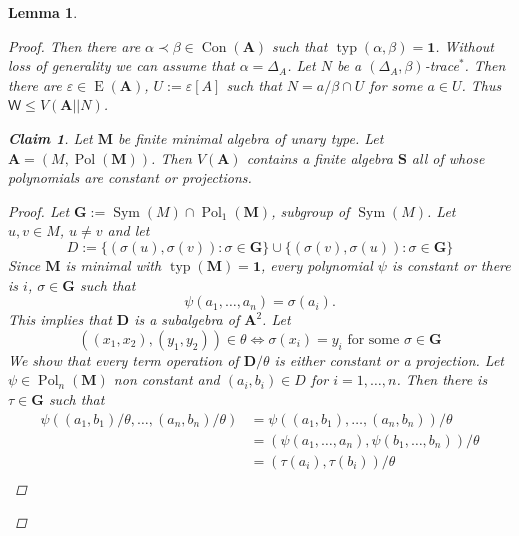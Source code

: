 \documentclass{amsart}
\theoremstyle{plain}
\newtheorem{lemma}[theorem]{Lemma}
\newtheorem{claim}{Claim}
\theoremstyle{definition}
\theoremstyle{remark}
\def\epsilon{\varepsilon}
\DeclareMathOperator{\Con}{Con}
\DeclareMathOperator{\Pol}{Pol}
\DeclareMathOperator{\typ}{typ}
\DeclareMathOperator{\Sym}{Sym}
\DeclareMathOperator{\Id}{E}
\begin{document}
\begin{lemma}
\begin{proof}
        Then there are $\alpha \prec \beta \in \Con(\mathbf{A})$ such that $\typ(\alpha, \beta) =\mathbf{1}$. 
        Without loss of generality we can assume that $\alpha = \Delta_A$. 
        Let $N$ be a $(\Delta_A, \beta)$-trace$^{*}$.
        Then there are $\epsilon \in \Id(\mathbf{A})$, $U:=\epsilon[A]$ such that $N = a /\beta \cap U$ for some $a \in U$. 
        Thus $\mathsf{W} \le V(\mathbf{A}||N)$. 
        \begin{claim}
            Let $\mathbf{M}$ be finite minimal algebra of unary type. 
            Let $\mathbf{A}=(M, \Pol(\mathbf{M}))$.
            Then $V(\mathbf{A})$ contains a finite algebra $\mathbf{S}$ all of whose polynomials are constant or projections. 
            \begin{proof}
                Let $\mathbf{G}:=\Sym(M) \cap \Pol_1(\mathbf{M})$, subgroup of $\Sym(M)$. 
                Let $u,v \in M$, $u \neq v$ and let 
                \begin{equation*}
                    D:=\{(\sigma(u), \sigma(v)) : \sigma \in \mathbf{G}\} \cup \{(\sigma(v), \sigma(u)) : \sigma \in \mathbf{G}\}
                \end{equation*}
                Since $\mathbf{M}$ is minimal with $\typ(\mathbf{M})=\mathbf{1}$, every polynomial $\psi$ is constant or there is $i$, $\sigma \in \mathbf{G}$ such that 
                \begin{equation*}
                    \psi(a_1, \ldots, a_n) = \sigma(a_i) \text{.}
                \end{equation*}
                This implies that $\mathbf{D}$ is a subalgebra of $\mathbf{A}^2$. 
                Let 
                \begin{equation*}
                    ((x_1, x_2), (y_1,y_2)) \in \theta \iff \sigma(x_i)=y_i \text{ for some } \sigma \in \mathbf{G}
                \end{equation*}
                We show that every term operation of $\mathbf{D}/\theta$ is either constant or a projection. 
                Let $\psi \in \Pol_n(\mathbf{M})$ non constant and $(a_i,b_i) \in D$ for $i=1, \ldots, n$. 
                Then there is $\tau \in \mathbf{G}$ such that 
                \begin{align*}
                   \psi((a_1, b_1)/\theta, \ldots, (a_n, b_n)/\theta) & = \psi((a_1, b_1), \ldots, (a_n, b_n)) /\theta \\
                   & = (\psi(a_1, \ldots, a_n), \psi(b_1,\ldots, b_n)) / \theta \\
                   & = (\tau(a_i), \tau(b_i)) / \theta \\

\end{align*}
\end{proof}
\end{claim}
\end{proof}
\end{lemma}
\end{document}

